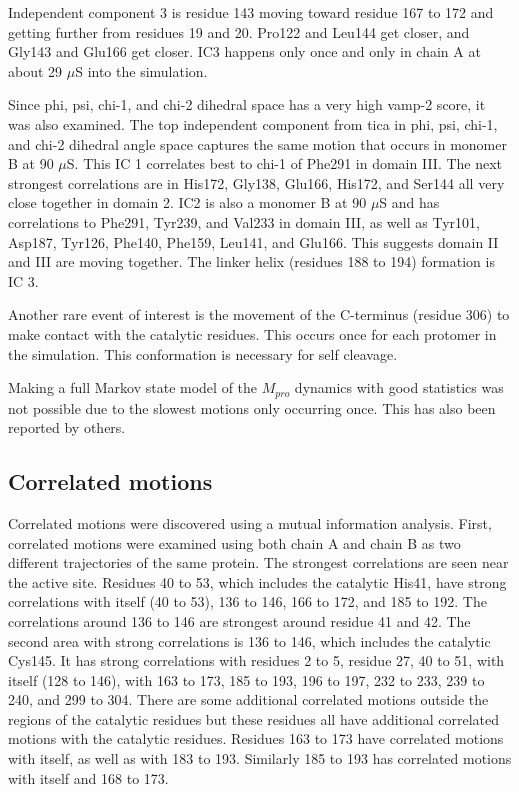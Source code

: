 \documentclass{biophys-new}
\begin{document}
Independent component 3 is residue 143 moving toward residue 167 to 172 and getting further from residues 19 and 20. Pro122 and Leu144 get closer, and Gly143 and Glu166 get closer. IC3 happens only once and only in chain A at about 29 $\mu$S into the simulation.

Since phi, psi, chi-1, and chi-2 dihedral space has a very high vamp-2 score, it was also examined. The top independent component from tica in phi, psi, chi-1, and chi-2 dihedral angle space captures the same motion that occurs in monomer B at 90 $\mu$S. This IC 1 correlates best to chi-1 of Phe291 in domain III. The next strongest correlations are in His172, Gly138, Glu166, His172, and Ser144 all very close together in domain 2. IC2 is also a monomer B at 90 $\mu$S and has correlations to Phe291, Tyr239, and Val233 in domain III, as well as Tyr101, Asp187, Tyr126, Phe140, Phe159, Leu141, and Glu166. This suggests domain II and III are moving together. The linker helix (residues 188 to 194) formation is IC 3. 

Another rare event of interest is the movement of the C-terminus (residue 306) to make contact with the catalytic residues. This occurs once for each protomer in the simulation. This conformation is necessary for self cleavage.\cite{muramatsu2016sars, noske2020crystallographic}

Making a full Markov state model of the $M_{pro}$ dynamics with good statistics was not possible due to the slowest motions only occurring once. This has also been reported by others. \cite{carli2020candidate, cocina2020sapphire}

\subsection*{Correlated motions}

Correlated motions were discovered using a mutual information analysis. First, correlated motions were examined using both chain A and chain B as two different trajectories of the same protein. The strongest correlations are seen near the active site. Residues 40 to 53, which includes the catalytic His41, have strong correlations with itself (40 to 53), 136 to 146, 166 to 172, and 185 to 192. The correlations around 136 to 146 are strongest around residue 41 and 42. The second area with strong correlations is 136 to 146, which includes the catalytic Cys145. It has strong correlations with residues 2 to 5, residue 27, 40 to 51, with itself (128 to 146), with 163 to 173, 185 to 193, 196 to 197, 232 to 233, 239 to 240, and 299 to 304. There are some additional correlated motions outside the regions of the catalytic residues but these residues all have additional correlated motions with the catalytic residues. Residues 163 to 173 have correlated motions with itself, as well as with 183 to 193. Similarly 185 to 193 has correlated motions with itself and 168 to 173.
\end{document}
